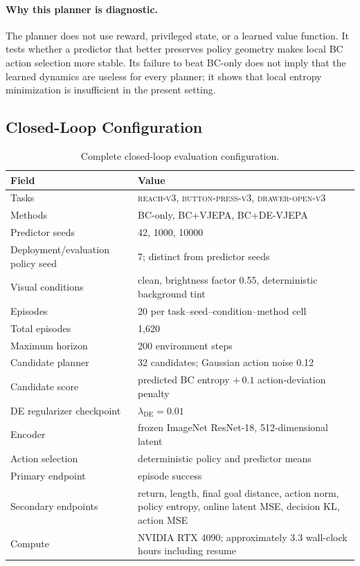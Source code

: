 \documentclass[10pt,twocolumn]{article}
\theoremstyle{tightstyle}
\begin{document}
\paragraph{Why this planner is diagnostic.}
The planner does not use reward, privileged state, or a learned value function.
It tests whether a predictor that better preserves policy geometry makes local
BC action selection more stable. Its failure to beat BC-only does not imply
that the learned dynamics are useless for every planner; it shows that local
entropy minimization is insufficient in the present setting.

\subsection{Closed-Loop Configuration}

\begin{table}[t]
\centering
\caption{Complete closed-loop evaluation configuration.}
\label{tab:closed-loop-config}
\begin{tabular}{@{}ll@{}}
\toprule
\textbf{Field} & \textbf{Value} \\
\midrule
Tasks & \textsc{reach-v3}, \textsc{button-press-v3},
\textsc{drawer-open-v3} \\
Methods & BC-only, BC+VJEPA, BC+DE-VJEPA \\
Predictor seeds & 42, 1000, 10000 \\
Deployment/evaluation policy seed & 7; distinct from predictor seeds \\
Visual conditions & clean, brightness factor 0.55, deterministic background tint \\
Episodes & 20 per task--seed--condition--method cell \\
Total episodes & 1,620 \\
Maximum horizon & 200 environment steps \\
Candidate planner & 32 candidates; Gaussian action noise 0.12 \\
Candidate score & predicted BC entropy $+\,0.1$ action-deviation penalty \\
DE regularizer checkpoint & $\lambda_{\mathrm{DE}}=0.01$ \\
Encoder & frozen ImageNet ResNet-18, 512-dimensional latent \\
Action selection & deterministic policy and predictor means \\
Primary endpoint & episode success \\
Secondary endpoints & return, length, final goal distance, action norm,
policy entropy, online latent MSE, decision KL, action MSE \\
Compute & NVIDIA RTX 4090; approximately 3.3 wall-clock hours including resume \\
\bottomrule
\end{tabular}
\end{table}
\end{document}
